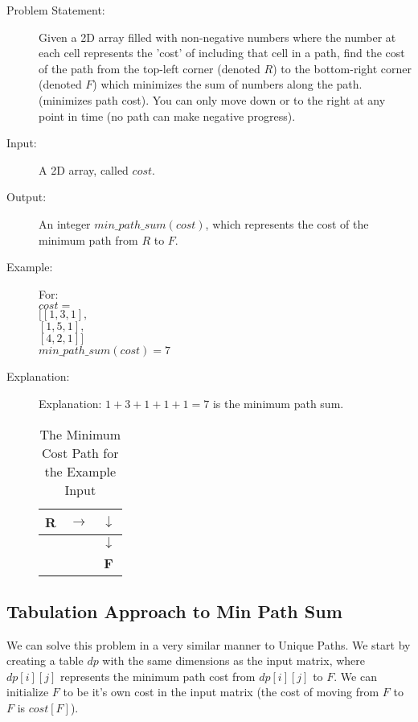 \begin{description}
    \item[Problem Statement:]
        Given a 2D array filled with non-negative numbers where the number at each cell represents the 'cost' of including that cell in a path,
        find the cost of the path from the top-left corner (denoted $R$) to the bottom-right corner (denoted $F$) which minimizes the sum of numbers along the path.
        (minimizes path cost).
        You can only move down or to the right at any point in time (no path can make negative progress).

    \item[Input:]
        A 2D array, called $cost$.
        
    \item[Output:]
        An integer $min\_path\_sum(cost)$, which represents the cost of the minimum path from $R$ to $F$.
        
    \item[Example:] For:\\
    $cost = $\\
    $[[1,3,1],$\\
    $[1,5,1],$\\
    $[4,2,1]]$\\

    $min\_path\_sum(cost) = 7$

    \item[Explanation:]
        Explanation: $1 + 3 + 1 + 1 + 1 = 7$ is the minimum path sum.
        \begin{table}[H]
            \centering
            \begin{tabular}{|c|c|c|}
                \hline
                \textbf{R} & $\rightarrow$ & $\downarrow$ \\
                \hline
                 &  & $\downarrow$ \\
                \hline
                 &  & \textbf{F} \\
                \hline
            \end{tabular}
            \caption{The Minimum Cost Path for the Example Input}
        \end{table}
        
\end{description}

\subsection*{Tabulation Approach to Min Path Sum}
We can solve this problem in a very similar manner to Unique Paths.
We start by creating a table $dp$ with the same dimensions as the input matrix, where $dp[i][j]$ represents the minimum path cost from $dp[i][j]$ to $F$.
We can initialize $F$ to be it's own cost in the input matrix (the cost of moving from $F$ to $F$ is $cost[F]$).

